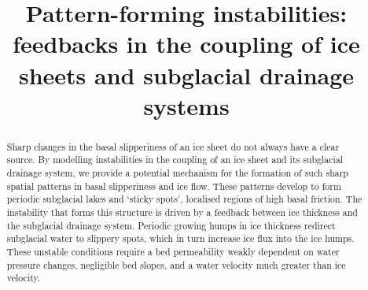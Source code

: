 \documentclass[journal abbreviation, manuscript]{copernicus}
\begin{document}
\title{Pattern-forming instabilities: feedbacks in the coupling of ice sheets and subglacial drainage systems}














\received{}
\pubdiscuss{} %
\revised{}
\accepted{}
\published{}




\maketitle

\begin{abstract}

 Sharp changes in the basal slipperiness of an ice sheet do not always have a clear source. By modelling instabilities in the coupling of an ice sheet and its subglacial drainage system, we provide a potential mechanism for the formation of such sharp spatial patterns in basal slipperiness and ice flow. These patterns develop to form periodic subglacial lakes and `sticky spots', localised regions of high basal friction.  The instability that forms this structure is driven by a feedback between ice thickness and the subglacial drainage system. Periodic growing humps in ice thickness redirect subglacial water to slippery spots, which in turn increase ice flux into the ice humps. These unstable conditions require a bed permeability weakly dependent on water pressure changes, negligible bed slopes, and a water velocity much greater than ice velocity. 
\end{abstract}
\end{document}
